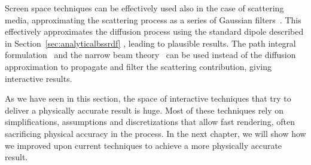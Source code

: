 Screen space techniques can be effectively used also in the case of scattering media, approximating the scattering process as a series of Gaussian filters~\cite{Jimenez2015}. This effectively approximates the diffusion process using the standard dipole described in Section~\ref{sec:analyticalbssrdf} \cite{Jensen2001}, leading to plausible results. The path integral formulation~\cite{Premoze2003, Hegeman2005} and the narrow beam theory~\cite{Shinya2016} can be used instead of the diffusion approximation to propagate and filter the scattering contribution, giving interactive results.

As we have seen in this section, the space of interactive techniques that try to deliver a physically accurate result is huge. Most of these techniques rely on simplifications, assumptions and discretizations that allow fast rendering, often sacrificing physical accuracy in the process. In the next chapter, we will show how we improved upon current techniques to achieve a more physically accurate result.
